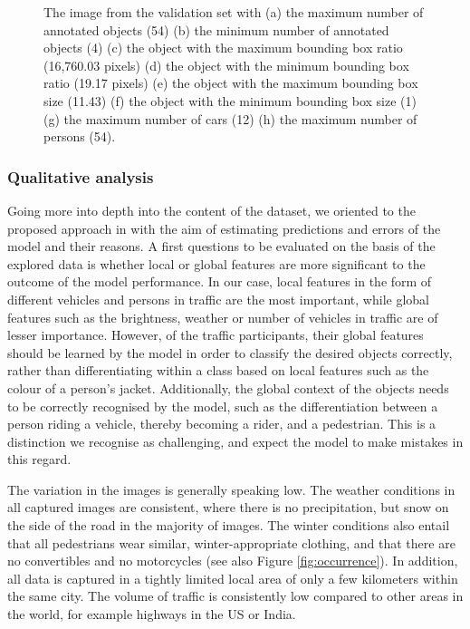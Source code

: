\documentclass{article}
\begin{document}
\begin{figure}[h!]
    \vspace{-0.1cm}
    \vspace{-0.49cm}
    \caption{The image from the validation set with (a) the maximum number of annotated objects (54) (b) the minimum number of annotated objects (4) (c) the object with the maximum bounding box ratio (16,760.03 pixels) (d) the object with the minimum bounding box ratio (19.17 pixels) (e) the object with the maximum bounding box size (11.43) (f) the object with the minimum bounding box size (1) (g) the maximum number of cars (12) (h) the maximum number of persons (54).}
    \label{fig:extreme_val}
\end{figure}
\newpage

\subsubsection*{Qualitative analysis}

Going more into depth into the content of the dataset, we oriented to the proposed approach in \cite{Karpathy2019} with the aim of estimating predictions and errors of the model and their reasons. A first questions to be evaluated on the basis of the explored data is whether local or global features are more significant to the outcome of the model performance. In our case, local features in the form of different vehicles and persons in traffic are the most important, while global features such as the brightness, weather or number of vehicles in traffic are of lesser importance. However, of the traffic participants, their global features should be learned by the model in order to classify the desired objects correctly, rather than differentiating within a class based on local features such as the colour of a person's jacket. Additionally, the global context of the objects needs to be correctly recognised by the model, such as the differentiation between a person riding a vehicle, thereby becoming a rider, and a pedestrian. This is a distinction we recognise as challenging, and expect the model to make mistakes in this regard.

The variation in the images is generally speaking low. The weather conditions in all captured images are consistent, where there is no precipitation, but snow on the side of the road in the majority of images. The winter conditions also entail that all pedestrians wear similar, winter-appropriate clothing, and that there are no convertibles and no motorcycles (see also Figure \ref{fig:occurrence}). In addition, all data is captured in a tightly limited local area of only a few kilometers within the same city. The volume of traffic is consistently low compared to other areas in the world, for example highways in the US or India.
\end{document}
